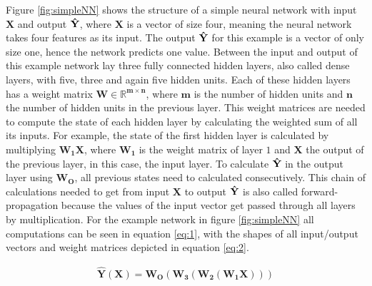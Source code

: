 Figure \ref{fig:simpleNN} shows the structure of a simple neural network with input $\mathbf{X}$ and output $\mathbf{\Hat{Y}}$, where $\mathbf{X}$ is a vector of size four, meaning the neural network takes four features as its input. 
The output $\mathbf{\Hat{Y}}$ for this example is a vector of only size one, hence the network predicts one value.
Between the input and output of this example network lay three fully connected hidden layers, also called dense layers, with five, three and again five hidden units.
Each of these hidden layers has a weight matrix $\mathbf{W\in\mathbb{R}^{m\times n}}$, where $\mathbf{m}$ is the number of hidden units and $\mathbf{n}$ the number of hidden units in the previous layer.
This weight matrices are needed to compute the state of each hidden layer by calculating the weighted sum of all its inputs.
For example, the state of the first hidden layer is calculated by multiplying $\mathbf{W_1X}$, where $\mathbf{W_1}$ is the weight matrix of layer $1$ and $\mathbf{X}$ the output of the previous layer, in this case, the input layer.
To calculate  $\mathbf{\Hat{Y}}$ in the output layer using $\mathbf{W_O}$, all previous states need to calculated consecutively. 
This chain of calculations needed to get from input $\mathbf{X}$ to output $\mathbf{\Hat{Y}}$ is also called forward-propagation because the values of the input vector get passed through all layers by multiplication.
For the example network in figure \ref{fig:simpleNN} all computations can be seen in equation \ref{eq:1}, with the shapes of all input/output vectors and weight matrices depicted in equation \ref{eq:2}.

\begin{equation} \label{eq:1}
\begin{gathered}
\mathbf{\hat{Y}(X)} = \mathbf{W_O(W_3(W_2(W_1X)))}
\end{gathered}
\end{equation}



